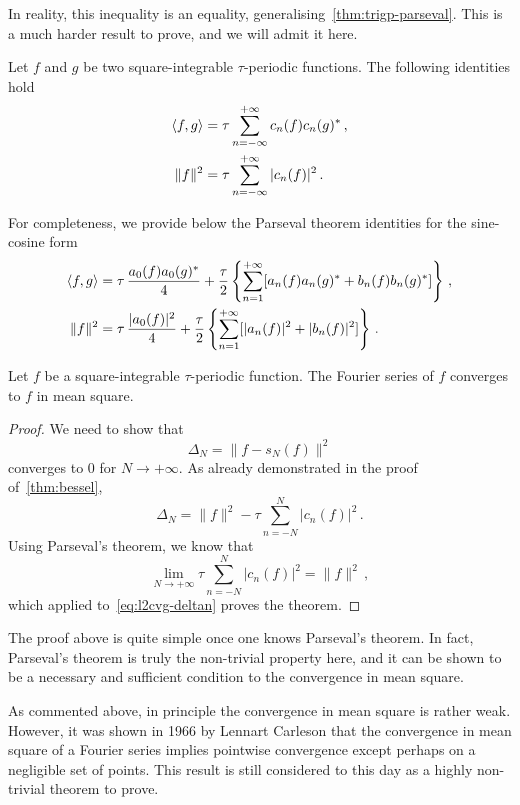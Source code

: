 In reality, this inequality is an equality, generalising~\cref{thm:trigp-parseval}. This
is a much harder result to prove, and we will admit it here.
\begin{theorem}[Parseval]
	\label{thm:parseval}
	Let $f$ and $g$ be two square-integrable $\tau$-periodic functions. The following
	identities hold
	\begin{align}
		\braket{f,g} & =\tau\sum_{n=-\infty}^{+\infty}c_n(f)c_n(g)^*\,,
		\label{eq:fs-dot}                             \\
		\|f\|^2      & =\tau\sum_{n=-\infty}^{+\infty}|c_n(f)|^2\,.
		\label{eq:fs-norm}
	\end{align}
\end{theorem}
For completeness, we provide below the Parseval theorem identities for the sine-cosine
form
\begin{align}
	\braket{f,g} & =\tau\,\frac{a_0(f)a_0(g)^*}{4}
	+\frac{\tau}{2}\left\{\sum_{n=1}^{+\infty}[a_n(f)a_n(g)^*+b_n(f)b_n(g)^*]\right\}\,, \\
	\|f\|^2      & =\tau\,\frac{|a_0(f)|^2}{4}
	+\frac{\tau}{2}\left\{\sum_{n=1}^{+\infty}[|a_n(f)|^2+|b_n(f)|^2]\right\}\,.
\end{align}
\begin{theorem}
	Let $f$ be a square-integrable $\tau$-periodic function. The Fourier series of $f$
	converges to $f$ in mean square.
\end{theorem}
\begin{proof}
	We need to show that
	\begin{equation}
		\Delta_N =\|f-s_N(f)\|^2
	\end{equation}
	converges to $0$ for $N\to+\infty$. As already demonstrated in the proof
	of~\cref{thm:bessel},
	\begin{equation}
		\Delta_N =\|f\|^2-\tau\sum_{n=-N}^{N}|c_n(f)|^2\,.\label{eq:l2cvg-deltan}
	\end{equation}
	Using Parseval's theorem, we know that
	\begin{equation}
		\lim_{N\to+\infty}\tau\sum_{n=-N}^{N}|c_n(f)|^2=\|f\|^2\,,
	\end{equation}
	which applied to~\cref{eq:l2cvg-deltan} proves the theorem.
\end{proof}
The proof above is quite simple once one knows Parseval's theorem. In fact, Parseval's
theorem is truly the non-trivial property here, and it can be shown to be a necessary and
sufficient condition to the convergence in mean square.

As commented above, in principle the convergence in mean square is rather weak. However,
it was shown in 1966 by Lennart Carleson that the convergence in mean square of a Fourier
series implies pointwise convergence except perhaps on a negligible set of points. This
result is still considered to this day as a highly non-trivial theorem to prove.

